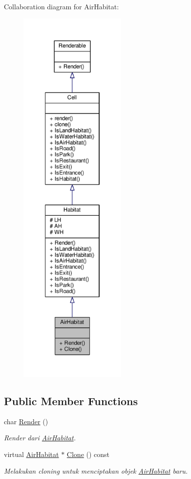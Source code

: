 Collaboration diagram for Air\+Habitat\+:
\nopagebreak
\begin{figure}[H]
\begin{center}
\leavevmode
\includegraphics[height=550pt]{classAirHabitat__coll__graph}
\end{center}
\end{figure}
\subsection*{Public Member Functions}
\begin{DoxyCompactItemize}
\item 
char \hyperlink{classAirHabitat_a6dd1a0d8235d9687874bb229099d40ff}{Render} ()
\begin{DoxyCompactList}\small\item\em Render dari \hyperlink{classAirHabitat}{Air\+Habitat}. \end{DoxyCompactList}\item 
virtual \hyperlink{classAirHabitat}{Air\+Habitat} $\ast$ \hyperlink{classAirHabitat_a23b2fa15b4211838a9911ab7c5afac07}{Clone} () const 
\begin{DoxyCompactList}\small\item\em Melakukan cloning untuk menciptakan objek \hyperlink{classAirHabitat}{Air\+Habitat} baru. \end{DoxyCompactList}\end{DoxyCompactItemize}
